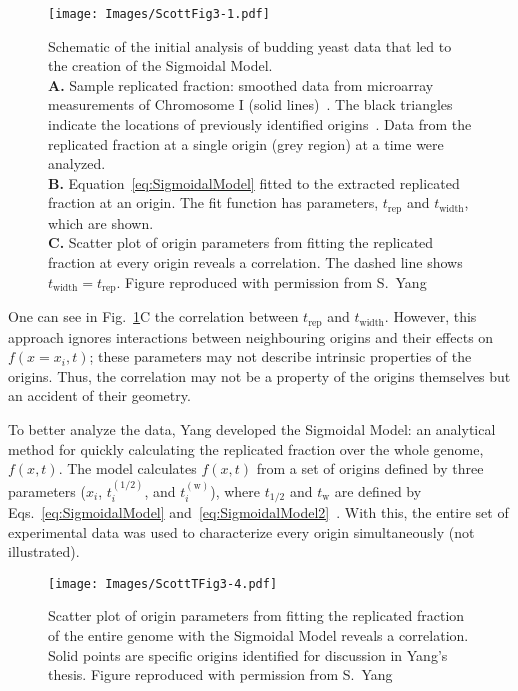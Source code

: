 {	\begin{figure}[tbh!]
		\begin{center}
			\texttt{[image: Images/ScottFig3-1.pdf]}
		\end{center}
			\caption[Schematic of Pre-Sigmoidal Model Analysis of Budding Yeast]{\label{fig:SigmoidalModel} Schematic of the initial analysis of budding yeast data that led to the creation of the Sigmoidal Model.\\
				\textbf{A.} Sample replicated fraction: smoothed data from microarray measurements of Chromosome I (solid lines)~\cite{McCuneMicroArray}.
				The black triangles indicate the locations of previously identified origins~\cite{OriginLocations}.
				Data from the replicated fraction at a single origin (grey region) at a time were analyzed.\\
				\textbf{B.} Equation~\ref{eq:SigmoidalModel} fitted to the extracted replicated fraction at an origin.
				The fit function has parameters, $t_{\text{rep}}$ and $t_{\text{width}}$, which are shown.\\
				\textbf{C.} Scatter plot of origin parameters from fitting the replicated fraction at every origin reveals a correlation.
				The dashed line shows $t_{\text{width}}=t_{\text{rep}}$.
				Figure reproduced with permission from S.~Yang~\cite{ScottsThesis}}
	\end{figure}
	
	One can see in Fig.~\ref{fig:SigmoidalModel}C the correlation between $t_\text{rep}$ and $t_\text{width}$.
	However, this approach ignores interactions between neighbouring origins and their effects on $f(x=x_i,t)$; these parameters may not describe intrinsic properties of the origins.
	Thus, the correlation may not be a property of the origins themselves but an accident of their geometry.
	
	To better analyze the data, Yang developed the Sigmoidal Model: an analytical method for quickly calculating the replicated fraction over the whole genome, $f(x,t)$.
	The model calculates $f(x,t)$ from a set of origins defined by three parameters ($x_i$, $t_i^{(1/2)}$, and $t^{(\text{w})}_i$), where $t_{1/2}$ and $t_\text{w}$ are defined by Eqs.~\ref{eq:SigmoidalModel} and~\ref{eq:SigmoidalModel2}~\cite{ScottsThesis}.
	With this, the entire set of experimental data was used to characterize every origin simultaneously (not illustrated).
	
	\begin{figure}[tbh]
		\begin{center}
			\texttt{[image: Images/ScottTFig3-4.pdf]}
		\end{center}
			\caption[Scatter Plot of median-vs.-width Firing Times]{\label{fig:SigmoidalModel2} Scatter plot of origin parameters from fitting the replicated fraction of the entire genome with the Sigmoidal Model reveals a correlation.
				Solid points are specific origins identified for discussion in Yang's thesis.
				Figure reproduced with permission from S.~Yang~\cite{ScottsThesis}}
	\end{figure}
	
}
